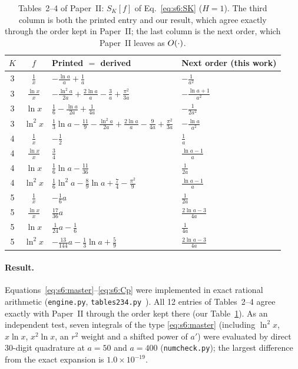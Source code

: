 \documentclass[aps,prd,onecolumn,10pt,nofootinbib,floatfix]{revtex4-2}
\newcommand{\PII}{Paper~II}
\begin{document}
\begin{table}[htbp]
\caption{Tables~2--4 of \PII: $S_K[f]$ of Eq.~\eqref{eq:s6:SK} ($H=1$). The third column is both the printed entry and
our result, which agree exactly through the order kept in \PII; the last column is the next order, which \PII{} leaves
as $O(\cdot)$.}
\label{tab:s6:tab234}
\renewcommand{\arraystretch}{1.35}
\begin{ruledtabular}
\begin{tabular}{c c l l}
$K$ & $f$ & Printed $=$ derived & Next order (this work)\\
\hline
3 & $\frac1x$ & $-\frac{\ln a}a+\frac1a$ & $-\frac1{a^2}$\\
3 & $\frac{\ln x}x$ & $-\frac{\ln^2a}{2a}+\frac{2\ln a}a-\frac3a+\frac{\pi^2}{3a}$ & $-\frac{\ln a+1}{a^2}$\\
3 & $\ln x$ & $\frac16-\frac{\ln a}{2a}+\frac1{4a}$ & $-\frac1{2a^2}$\\
3 & $\ln^2x$ & $\frac13\ln a-\frac{11}9-\frac{\ln^2a}{2a}+\frac{2\ln a}a-\frac9{4a}+\frac{\pi^2}{3a}$ & $-\frac{\ln a}{a^2}$\\
\hline
4 & $\frac1x$ & $-\frac12$ & $\frac1a$\\
4 & $\frac{\ln x}x$ & $\frac34$ & $\frac{\ln a-1}a$\\
4 & $\ln x$ & $\frac16\ln a-\frac{11}{36}$ & $\frac1{2a}$\\
4 & $\ln^2x$ & $\frac16\ln^2a-\frac89\ln a+\frac74-\frac{\pi^2}9$ & $\frac{\ln a-1}a$\\
\hline
5 & $\frac1x$ & $-\frac16a$ & $\frac1{2a}$\\
5 & $\frac{\ln x}x$ & $\frac{17}{36}a$ & $\frac{2\ln a-3}{4a}$\\
5 & $\ln x$ & $\frac1{24}a-\frac16$ & $\frac1{4a}$\\
5 & $\ln^2x$ & $-\frac{13}{144}a-\frac13\ln a+\frac59$ & $\frac{2\ln a-3}{4a}$\\
\end{tabular}
\end{ruledtabular}
\end{table}

\paragraph*{Result.}
Equations~\eqref{eq:s6:master}--\eqref{eq:s6:Cp} were implemented in exact rational arithmetic
(\texttt{engine.py}, \texttt{tables234.py}~\cite{ref:repo}). All 12 entries of Tables~2--4 agree exactly with \PII{}
through the order kept there (our Table~\ref{tab:s6:tab234}). As an independent test, seven integrals of the type
\eqref{eq:s6:master} (including $\ln^2x$, $x\ln x$, $x^2\ln x$, an $r^2$ weight and a shifted power of $a'$) were evaluated
by direct 30-digit quadrature at $a=50$ and $a=400$ (\texttt{numcheck.py}); the largest difference from the exact
expansion is $1.0\times10^{-19}$.
\end{document}
